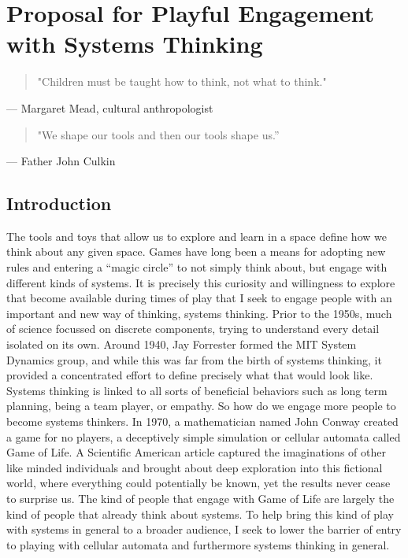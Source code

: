 \chapter{Proposal for Playful Engagement with Systems Thinking}
\begin{quotation}"Children must be taught how to think, not what to think."\end{quotation}
 — Margaret Mead, cultural anthropologist 

\begin{quotation}"We shape our tools and then our tools shape us.”\end{quotation}
 — Father John Culkin

\section{Introduction}
The tools and toys that allow us to explore and learn in a space define how we think about any given space. Games have long been a means for adopting new rules and entering a “magic circle” to not simply think about, but engage with different kinds of systems. It is precisely this curiosity and willingness to explore that become available during times of play that I seek to engage people with an important and new way of thinking, systems thinking. Prior to the 1950s, much of science focussed on discrete components, trying to understand every detail isolated on its own. Around 1940, Jay Forrester formed the MIT System Dynamics group, and while this was far from the birth of systems thinking, it provided a concentrated effort to define precisely what that would look like. Systems thinking is linked to all sorts of beneficial behaviors such as long term planning, being a team player, or empathy. So how do we engage more people to become systems thinkers. In 1970, a mathematician named John Conway created a game for no players, a deceptively simple simulation or cellular automata called Game of Life. A Scientific American article captured the imaginations of other like minded individuals and brought about deep exploration into this fictional world, where everything could potentially be known, yet the results never cease to surprise us. The kind of people that engage with Game of Life are largely the kind of people that already think about systems. To help bring this kind of play with systems in general to a broader audience, I seek to lower the barrier of entry to playing with cellular automata and furthermore systems thinking in general.

